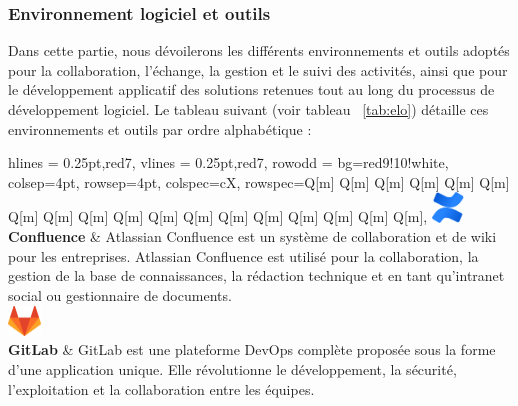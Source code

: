 \subsubsection{Environnement logiciel et outils}
Dans cette partie, nous dévoilerons les différents environnements et outils adoptés pour la collaboration, l'échange, la gestion et le suivi des activités, ainsi que pour le développement applicatif des solutions retenues tout au long du processus de développement logiciel. Le tableau suivant (voir tableau ~\ref{tab:elo}) détaille ces environnements et outils par ordre alphabétique :
\begin{longtblr}[caption={Environnements et outils de développement et de collaboration},label={tab:elo}]{
    hlines = {0.25pt,red7},
    vlines = {0.25pt,red7},
    row{odd} = {bg=red9!10!white},
    colsep=4pt,
    rowsep=4pt,
	colspec={cX},
    rowspec={Q[m] Q[m] Q[m] Q[m] Q[m] Q[m] Q[m] Q[m] Q[m] Q[m] Q[m] Q[m] Q[m] Q[m] Q[m] Q[m] Q[m] Q[m]},
}
{
\includegraphics[height=8mm]{images/sec5/confluence.pdf}
\\\textbf{Confluence}
}
& 
Atlassian Confluence est un système de collaboration et de wiki pour les entreprises.
Atlassian Confluence est utilisé pour la collaboration, la gestion de la base de connaissances, la rédaction technique et en tant qu'intranet social ou gestionnaire de documents.\\

{
\includegraphics[height=8mm]{images/sec5/gitlab.pdf}\\\textbf{GitLab}
}
& 
GitLab est une plateforme DevOps complète proposée sous la forme d'une application unique. Elle révolutionne le développement, la sécurité, l'exploitation et la collaboration entre les équipes. 
\\


\end{longtblr}
